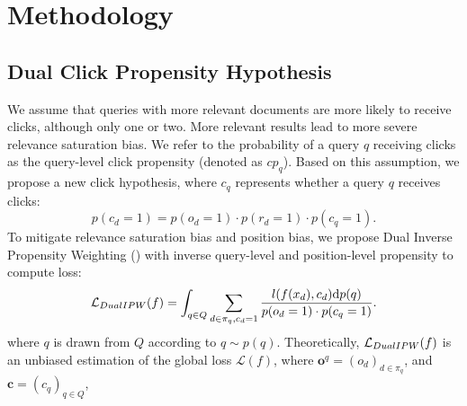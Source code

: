 \section{Methodology}
\subsection{Dual Click Propensity Hypothesis}
\label{theory}
We assume that queries with more relevant documents are more likely to receive clicks, although only one or two. More relevant results lead to more severe relevance saturation bias. We refer to the probability of a query $q$ receiving clicks as the query-level click propensity (denoted as $cp_q$). Based on this assumption, we propose a new click hypothesis, where $c_q$ represents whether a query $q$ receives clicks:
\begin{equation}
\label{hypothesis}
p(c_d=1)=p(o_d=1)\cdot p(r_d=1)\cdot p(c_q=1)\text{.}
\end{equation}
To mitigate relevance saturation bias and position bias, we propose Dual Inverse Propensity Weighting (\m) with inverse query-level and position-level propensity to compute loss:
\begin{equation}
\mathcal{L}_{DualIPW}(f)=\int_{q\in Q} \sum_{d\in \pi_q, c_d=1}\frac{ l(f(x_d),c_d)\text{d}p(q)}{p(o_d=1)\cdot p(c_q=1)}\text{.}
\end{equation}
where $q$ is drawn from $Q$ according to $q\sim p(q)$.
Theoretically, $\mathcal{L}_{DualIPW}(f)$ is an unbiased estimation of the global loss $\mathcal{L}(f)$, where $\mathbf{o}^q=(o_d)_{d\in \pi_q}$, and $\mathbf{c}=(c_q)_{q\in Q}$,
